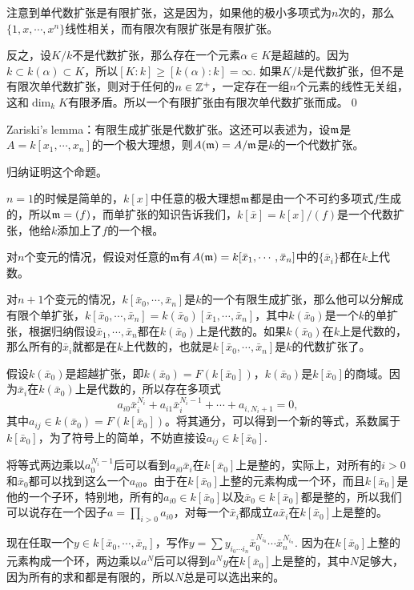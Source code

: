 \proof 注意到单代数扩张是有限扩张，这是因为，如果他的极小多项式为$n$次的，那么$\{1,x,\cdots,x^n\}$线性相关，而有限次有限扩张是有限扩张。

反之，设$K/k$不是代数扩张，那么存在一个元素$\alpha\in K$是超越的。因为$k\subset k(\alpha)\subset K$，所以$[K:k]\geq [k(\alpha):k]=\infty$. 如果$K/k$是代数扩张，但不是有限次单代数扩张，则对于任何的$n\in \mathbb{Z}^+$，一定存在一组$n$个元素的线性无关组，这和$\dim_k K$有限矛盾。所以一个有限扩张由有限次单代数扩张而成。\qed

\lem Zariski's lemma：有限生成扩张是代数扩张。这还可以表述为，设$\mathfrak{m}$是$A=k[x_1,\cdots,x_n]$的一个极大理想，则$A(\mathfrak{m})=A/\mathfrak{m}$是$k$的一个代数扩张。

\proof 归纳证明这个命题。

	$n=1$的时候是简单的，$k[x]$中任意的极大理想$\mathfrak{m}$都是由一个不可约多项式$f$生成的，所以$\mathfrak{m}=(f)$，而单扩张的知识告诉我们，$k[\bar{x}]=k[x]/(f)$是一个代数扩张，他给$k$添加上了$f$的一个根。

	对$n$个变元的情况，假设对任意的$\mathfrak{m}$有$A(\mathfrak{m})=k[\bar{x}_1,\cdots,\bar{x}_n]$中的$\{\bar{x}_i\}$都在$k$上代数。

	对$n+1$个变元的情况，$k[\bar{x}_0,\cdots,\bar{x}_{n}]$是$k$的一个有限生成扩张，那么他可以分解成有限个单扩张，$k[\bar{x}_0,\cdots,\bar{x}_{n}]=k(\bar{x}_0)[\bar{x}_1,\cdots,\bar{x}_{n}]$，其中$k(\bar{x}_0)$是一个$k$的单扩张，根据归纳假设$\bar{x}_1,\cdots,\bar{x}_{n}$都在$k(\bar{x}_0)$上是代数的。如果$k(\bar{x}_0)$在$k$上是代数的，那么所有的$\bar{x}_i$就都是在$k$上代数的，也就是$k[\bar{x}_0,\cdots,\bar{x}_{n}]$是$k$的代数扩张了。

	假设$k(\bar{x}_0)$是超越扩张，即$k(\bar{x}_0)=F(k[\bar{x}_0])$，$k(\bar{x}_0)$是$k[\bar{x}_0]$的商域。因为$\bar{x}_i$在$k(\bar{x}_0)$上是代数的，所以存在多项式
	\[
		a_{i0}\bar{x}_i^{N_i}+a_{i1}\bar{x}_i^{N_i-1}+\cdots +a_{i,N_i+1}=0,
	\]
	其中$a_{ij}\in k(\bar{x}_0)=F(k[\bar{x}_0])$。将其通分，可以得到一个新的等式，系数属于$k[\bar{x}_0]$，为了符号上的简单，不妨直接设$a_{ij}\in k[\bar{x}_0]$.

	将等式两边乘以$a_0^{N_i-1}$后可以看到$a_{i0}\bar{x}_i$在$k[\bar{x}_0]$上是整的，实际上，对所有的$i>0$和$\bar{x}_0$都可以找到这么一个$a_{i0}$。由于在$k[\bar{x}_0]$上整的元素构成一个环，而且$k[\bar{x}_0]$是他的一个子环，特别地，所有的$a_{i0}\in k[\bar{x}_0]$以及$\bar{x}_0\in k[\bar{x}_0]$都是整的，所以我们可以说存在一个因子$a=\prod_{i>0}a_{i0}$，对每一个$\bar{x}_i$都成立$a\bar{x}_i$在$k[\bar{x}_0]$上是整的。

	现在任取一个$y\in k[\bar{x}_0,\cdots,\bar{x}_n]$，写作$y=\sum y_{i_0 \cdots i_n}\bar{x}_0^{N_{i_0}}\cdots\bar{x}_{n}^{N_{i_n}}$.
	因为在$k[\bar{x}_0]$上整的元素构成一个环，两边乘以$a^N$后可以得到$a^Ny$在$k[\bar{x}_0]$上是整的，其中$N$足够大，因为所有的求和都是有限的，所以$N$总是可以选出来的。

